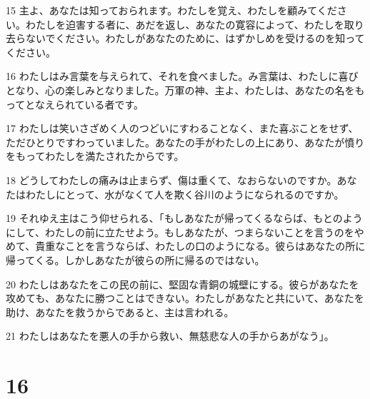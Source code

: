 \par 15 主よ、あなたは知っておられます。わたしを覚え、わたしを顧みてください。わたしを迫害する者に、あだを返し、あなたの寛容によって、わたしを取り去らないでください。わたしがあなたのために、はずかしめを受けるのを知ってください。
\par 16 わたしはみ言葉を与えられて、それを食べました。み言葉は、わたしに喜びとなり、心の楽しみとなりました。万軍の神、主よ、わたしは、あなたの名をもってとなえられている者です。
\par 17 わたしは笑いさざめく人のつどいにすわることなく、また喜ぶことをせず、ただひとりですわっていました。あなたの手がわたしの上にあり、あなたが憤りをもってわたしを満たされたからです。
\par 18 どうしてわたしの痛みは止まらず、傷は重くて、なおらないのですか。あなたはわたしにとって、水がなくて人を欺く谷川のようになられるのですか。
\par 19 それゆえ主はこう仰せられる、「もしあなたが帰ってくるならば、もとのようにして、わたしの前に立たせよう。もしあなたが、つまらないことを言うのをやめて、貴重なことを言うならば、わたしの口のようになる。彼らはあなたの所に帰ってくる。しかしあなたが彼らの所に帰るのではない。
\par 20 わたしはあなたをこの民の前に、堅固な青銅の城壁にする。彼らがあなたを攻めても、あなたに勝つことはできない。わたしがあなたと共にいて、あなたを助け、あなたを救うからであると、主は言われる。
\par 21 わたしはあなたを悪人の手から救い、無慈悲な人の手からあがなう」。

\chapter{16}

